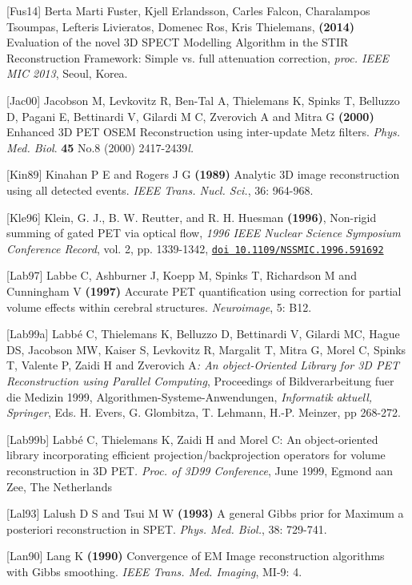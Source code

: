 \documentclass{article}
\def\url#1#2{\mbox{\href{#1}{\tt #2}}}
\begin{document}
{{[Fus14{]} Berta Marti Fuster, Kjell Erlandsson, Carles Falcon, Charalampos Tsoumpas, Lefteris
  Livieratos, Domenec Ros, Kris Thielemans, \textbf{(2014)}
  Evaluation of the novel 3D SPECT Modelling Algorithm in the
  STIR Reconstruction Framework: Simple vs. full attenuation correction, 
  \textit{proc. IEEE MIC 2013}, Seoul, Korea.

{[}Jac00] Jacobson M, Levkovitz R, Ben-Tal A, Thielemans K, Spinks 
T, Belluzzo D, Pagani E, Bettinardi V, Gilardi M C, Zverovich 
A and Mitra G \textbf{(2000)} Enhanced 3D PET OSEM Reconstruction 
using inter-update Metz filters. \textit{Phys. Med. Biol}. \textbf{45} No.8 
(2000) 2417-2439\textit{l.}


{[}Kin89] Kinahan P E and Rogers J G \textbf{(1989)} Analytic 3D image 
reconstruction using all detected events. \textit{IEEE Trans. Nucl. 
Sci.}, 36: 964-968.


[Kle96]
Klein, G. J., B. W. Reutter, and R. H. Huesman \textbf{(1996)}, Non-rigid summing of gated PET via optical flow, \textit{1996 IEEE Nuclear
Science Symposium Conference Record},
vol. 2, pp. 1339-1342, 
\url{http://dx.doi.org/10.1109/NSSMIC.1996.591692}{doi 10.1109/NSSMIC.1996.591692}

{[}Lab97] Labbe C, Ashburner J, Koepp M, Spinks T, Richardson M 
and Cunningham V \textbf{(1997)} Accurate PET quantification using 
correction for partial volume effects within cerebral structures. \textit{Neuroimage}, 
5: B12.


{[}Lab99a] Labb\'{e} C, Thielemans K, Belluzzo D, Bettinardi V, Gilardi 
MC, Hague DS, Jacobson MW, Kaiser S, Levkovitz R, Margalit T, 
Mitra G, Morel C, Spinks T, Valente P, Zaidi H and Zverovich A\textit{: 
An object-Oriented Library for 3D PET Reconstruction using Parallel 
Computing}, Proceedings of Bildverarbeitung fuer die Medizin 
1999, Algorithmen-Systeme-Anwendungen, \textit{Informatik} 
\textit{aktuell, Springer}, Eds. H. Evers, G. Glombitza, T. Lehmann, 
H.-P. Meinzer, pp 268-272. 

{[}Lab99b] Labb\'{e} C, Thielemans K, Zaidi H and Morel C: An object-oriented 
library incorporating efficient projection/backprojection operators 
for volume reconstruction in 3D PET\textit{. Proc. of 3D99 Conference}, 
June 1999, Egmond aan Zee, The Netherlands 


{[}Lal93] Lalush D S and Tsui M W \textbf{(1993)} A general Gibbs prior 
for Maximum a posteriori reconstruction in SPET. \textit{Phys. Med. 
Biol.}, 38: 729-741.

{[}Lan90] Lang K \textbf{(1990)} Convergence of EM Image reconstruction 
algorithms with Gibbs smoothing. \textit{IEEE Trans. Med. Imaging}, 
MI-9: 4.

}}
\end{document}
